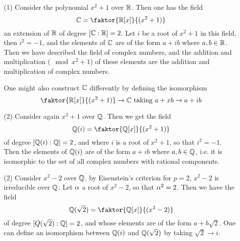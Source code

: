 \begin{example}\label{example_1.3}
    \begin{enumerate}
        \item[(1)] Consider the polynomial $x^2+1$ over $\mathbb{R}$. Then one has the
            field
            \begin{equation*}
                \C=\faktor{\R[x]}{(x^2+1)}
            \end{equation*}
            an extension of $\mathbb{R}$ of degree $[\mathbb{C} : \mathbb{R}]=2$. Let $i$ be a root of
            $x^2+1$ in this field, then $i^2=-1$, and the elements of $\mathbb{C}$ are of
            the form $a+ib$ where  $a,b \in \mathbb{R}$. Then we have described the
            field of complex numbers, and the addition and multiplication
            ($\mod{x^2+1}$) of these elements are the addition and
            multiplication of complex numbers.

            One might also construct $\mathbb{C}$ differently by defining the
            isomorphism
            \begin{equation*}
                \faktor{\R[x]}{(x^2+1)} \xrightarrow{} \C \text{ taking }
                a+xb    \xrightarrow{} a+ib
            \end{equation*}

        \item[(2)] Consider again $x^2+1$ over  $\mathbb{Q}$. Then we get the field
            \begin{equation*}
                \Q(i)=\faktor{\Q[x]}{(x^2+1)}
            \end{equation*}
            of degree $[\mathbb{Q}(i):\mathbb{Q}]=2$, and where $i$ is a root of  $x^2+1$, so
            that  $i^2=-1$. Then the elements of  $\mathbb{Q}(i)$ are of the form $a+ib$
            where  $a,b \in \mathbb{Q}$, i.e. it is isomorphic to the set of all complex
            numbers with rational components.

        \item[(2)] Consider $x^2-2$ over  $\mathbb{Q}$. by Eisenstein's criterion for
            $p=2$,  $x^2-2$ is irreducible over  $\mathbb{Q}$. Let $\alpha$ a root of
            $x^2-2$, so that  $\alpha^2=2$. Then we have the field
            \begin{equation*}
                \Q(\sqrt{2})=\faktor{\Q[x]}{(x^2-2)}
            \end{equation*}
            of degree $[Q(\sqrt{2}) : \mathbb{Q}]=2$, and whose elements are of the form
            $a+b\sqrt{2}$. One can define an isomorphism between $\mathbb{Q}(i)$ and
            $\mathbb{Q}(\sqrt{2})$ by taking $\sqrt{2} \xrightarrow{} i$.


\end{enumerate}
\end{example}
